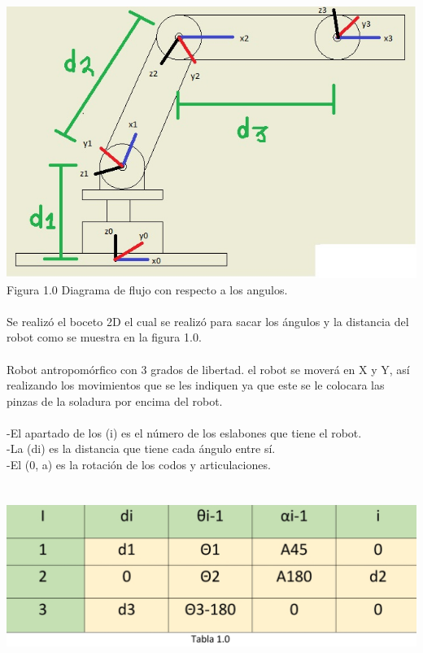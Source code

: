 \documentclass[12pt,a4paper]{article}
\begin{document}
\includegraphics[scale=1]{angulos.jpeg} 
\\
Figura 1.0 Diagrama de flujo con respecto a los angulos.
\\\\
Se realizó el boceto 2D el cual se realizó para sacar los ángulos y la distancia del robot como se muestra en la figura 1.0.
\\\\
Robot antropomórfico con 3 grados de libertad.
el robot se moverá en X y Y, así realizando los movimientos que se les indiquen ya que este se le colocara las pinzas de la soladura por encima del robot.
\\\\
-El apartado de los (i) es el número de los eslabones que tiene el robot.
\\
-La (di) es la distancia que tiene cada ángulo entre sí.
\\
-El (0, a) es la rotación de los codos y articulaciones.
\\\\\\
\includegraphics[scale=0.4]{tabla1.jpeg} 
\\\\\\\\
\end{document}

